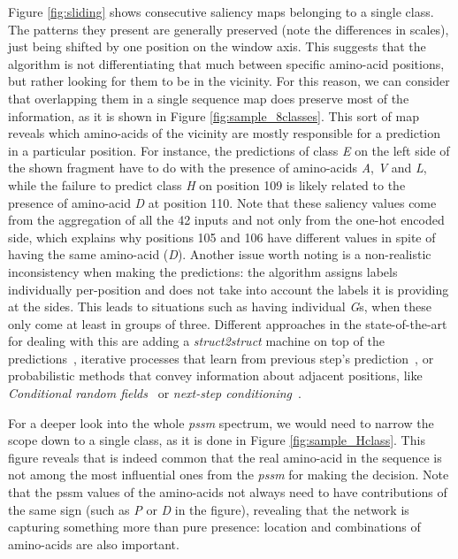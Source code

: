 	Figure \ref{fig:sliding} shows consecutive saliency maps belonging to a single class. The patterns they present are generally preserved (note the differences in scales), just being shifted by one position on the window axis. This suggests that the algorithm is not differentiating that much between specific amino-acid positions, but rather looking for them to be in the vicinity. For this reason, we can consider that overlapping them in a single sequence map does preserve most of the information, as it is shown in Figure \ref{fig:sample_8classes}. This sort of map reveals which amino-acids of the vicinity are mostly responsible for a prediction in a particular position. For instance, the  predictions of class \textit{E} on the left side of the shown fragment have to do with the presence of amino-acids \textit{A}, \textit{V} and \textit{L}, while the failure to predict class \textit{H} on position 109 is likely related to the presence of amino-acid \textit{D} at position 110. Note that these saliency values come from the aggregation of all the 42 inputs and not only from the one-hot encoded side, which explains why positions 105 and 106 have different values in spite of having the same amino-acid (\textit{D}). Another issue worth noting is a non-realistic inconsistency when making the predictions: the algorithm assigns labels individually per-position and does not take into account the labels it is providing at the sides. This leads to situations such as having individual \textit{G}s, when these only come at least in groups of three. Different approaches in the state-of-the-art for dealing with this are adding a \textit{struct2struct} machine on top of the predictions~\cite{Rost1993,Fang2017}, iterative processes that learn from previous step's prediction~\cite{Heffernan2017}, or probabilistic methods that convey information about adjacent positions, like \textit{Conditional random fields}~\cite{Wang2016} or \textit{next-step conditioning}~\cite{Busia2017}.
	
	For a deeper look into the whole \textit{pssm} spectrum, we would need to narrow the scope down to a single class, as it is done in Figure \ref{fig:sample_Hclass}. This figure reveals that is indeed common that the real amino-acid in the sequence is not among the most influential ones from the \textit{pssm} for making the decision. Note that the pssm values of the amino-acids not always need to have contributions of the same sign (such as \textit{P} or \textit{D} in the figure), revealing that the network is capturing something more than pure presence: location and combinations of amino-acids are also important.
	
